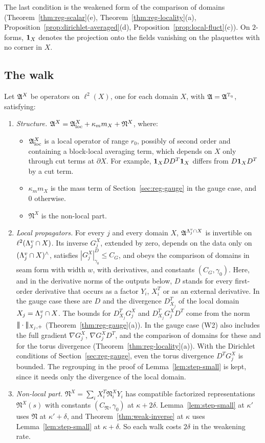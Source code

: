 The last condition is the weakened form of the comparison of domains (Theorem~\ref{thm:reg-scalar}(e), Theorem~\ref{thm:reg-locality}(a), Proposition~\ref{prop:dirichlet-averaged}(d), Proposition~\ref{prop:local-fluct}(c)). On $2$-forms, $\mathbf 1_X$ denotes the projection onto the fields vanishing on the plaquettes with no corner in $X$.

\subsection{The walk}\label{ss:41.2}

Let $\mathfrak A^X$ be operators on $\ell^2(X)$, one for each domain $X$, with $\mathfrak A=\mathfrak A^{\mathbb T_\eta}$, satisfying:
\begin{enumerate}[label=(W\arabic*)]
\item \emph{Structure.} $\mathfrak A^X=\mathfrak A^X_{\rm loc}+\kappa_mm_X+\mathfrak N^X$, where:
  \begin{itemize}
  \item $\mathfrak A^X_{\rm loc}$ is a local operator of range $r_0$, possibly of second order and containing a block-local averaging term, which depends on $X$ only through cut terms at $\partial X$. For example, $\mathbf 1_XDD^T\mathbf 1_X$ differs from $D\mathbf 1_XD^T$ by a cut term.
  \item $\kappa_mm_X$ is the mass term of Section~\ref{sec:reg-gauge} in the gauge case, and $0$ otherwise.
  \item $\mathfrak N^X$ is the non-local part.
  \end{itemize}
\item \emph{Local propagators.} For every $j$ and every domain $X$, $\mathfrak A^{\Lambda^v_j\cap X}$ is invertible on $\ell^2(\Lambda^v_j\cap X)$. Its inverse $G^X_j$, extended by zero, depends on the data only on $(\Lambda^v_j\cap X)^\wedge$, satisfies $|G^X_j|^D_{\gamma_0}\le C_G$, and obeys the comparison of domains in seam form with width $w$, with derivatives, and constants $(C_G,\gamma_0)$. Here, and in the derivative norms of the outputs below, $D$ stands for every first-order derivative that occurs as a factor $Y_i$, $X_i^T$ or as an external derivative. In the gauge case these are $D$ and the divergence $D^T_{X_j}$ of the local domain $X_j=\Lambda^v_j\cap X$. The bounds for $D^T_{X_j}G^X_j$ and $D^T_{X_j}G^X_jD^T$ come from the norm $|\!|\!|\cdot|\!|\!|_{X_j,+}$ (Theorem~\ref{thm:reg-gauge}(a)). In the gauge case (W2) also includes the full gradient $\nabla G^X_j$, $\nabla G^X_jD^T$, and the comparison of domains for these and for the torus divergence (Theorem~\ref{thm:reg-locality}(a)). With the Dirichlet conditions of Section~\ref{sec:reg-gauge}, even the torus divergence $D^TG^X_j$ is bounded. The regrouping in the proof of Lemma~\ref{lem:step-small} is kept, since it needs only the divergence of the local domain.
\item \emph{Non-local part.} $\mathfrak N^X=\sum_iX_i^T\mathfrak N^X_iY_i$ has compatible factorized representations $\mathfrak N^X(s)$ with constants $(C_{\mathfrak N},\gamma_0)$ at $\kappa+2\delta$. Lemma~\ref{lem:step-small} at $\kappa'$ uses $\mathfrak N$ at $\kappa'+\delta$, and Theorem~\ref{thm:weak-inverse} at $\kappa$ uses Lemma~\ref{lem:step-small} at $\kappa+\delta$. So each walk costs $2\delta$ in the weakening rate.
\end{enumerate}

